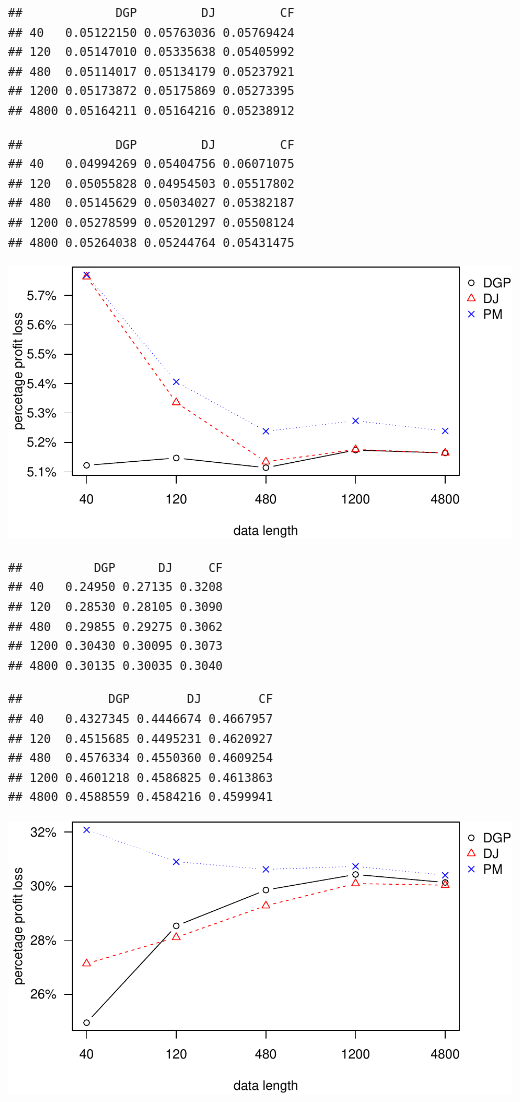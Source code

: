 \documentclass[
]{article}
\begin{document}
\begin{verbatim}
##             DGP         DJ         CF
## 40   0.05122150 0.05763036 0.05769424
## 120  0.05147010 0.05335638 0.05405992
## 480  0.05114017 0.05134179 0.05237921
## 1200 0.05173872 0.05175869 0.05273395
## 4800 0.05164211 0.05164216 0.05238912
\end{verbatim}

\begin{verbatim}
##             DGP         DJ         CF
## 40   0.04994269 0.05404756 0.06071075
## 120  0.05055828 0.04954503 0.05517802
## 480  0.05145629 0.05034027 0.05382187
## 1200 0.05278599 0.05201297 0.05508124
## 4800 0.05264038 0.05244764 0.05431475
\end{verbatim}

\includegraphics{information-plot_files/figure-latex/SAR(3)(1)_4ppl-1.pdf}

\begin{verbatim}
##          DGP      DJ     CF
## 40   0.24950 0.27135 0.3208
## 120  0.28530 0.28105 0.3090
## 480  0.29855 0.29275 0.3062
## 1200 0.30430 0.30095 0.3073
## 4800 0.30135 0.30035 0.3040
\end{verbatim}

\begin{verbatim}
##            DGP        DJ        CF
## 40   0.4327345 0.4446674 0.4667957
## 120  0.4515685 0.4495231 0.4620927
## 480  0.4576334 0.4550360 0.4609254
## 1200 0.4601218 0.4586825 0.4613863
## 4800 0.4588559 0.4584216 0.4599941
\end{verbatim}

\includegraphics{information-plot_files/figure-latex/SAR(3)(1)_4sl-1.pdf}
\end{document}

